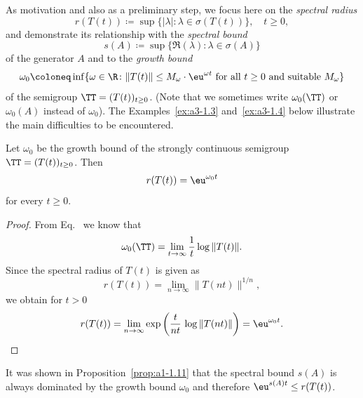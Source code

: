 As motivation and also as a preliminary step, we focus here on the \emph{spectral radius}
\begin{equation}\label{eq:a3-1.1}
	r(T(t)) \coloneq  \sup \{ |\lambda| \colon \lambda \in \sigma(T(t)) \}, \quad t \geq 0 ,
\end{equation}
and demonstrate its relationship with the \emph{spectral bound}
\begin{equation}\label{eq:a3-1.2}
	s(A) \coloneq  \sup \{ \Re(\lambda) \colon \lambda \in \sigma(A) \}
\end{equation}
of the generator $A$ and to the \emph{growth bound}
\begin{equation}\label{eq:a3-1.3}
	\omega_{0} \coloneq  \inf \{\omega \in \R  \colon \|T(t)\| \leq M_{\omega}\cdot \eu^{\omega t} \text{ for all } t \geq 0 \text{ and suitable } M_{\omega}\}
\end{equation}
of the semigroup $\TT = (T(t))_{t\geq 0}$.
(Note that we sometimes write $\omega_{0}(\TT)$ or $\omega_{0}(A)$ instead of\/ $\omega_{0}$).
%
The Examples~\ref{ex:a3-1.3} and~\ref{ex:a3-1.4} below illustrate the main difficulties to be encountered.
\begin{proposition}\label{prop:a3-1.1}
Let $\omega_{0}$ be the growth bound of the strongly continuous semigroup $\TT = (T(t))_{t\geq 0}$.
Then
\begin{equation}\label{eq:a3-1.4}
	r(T(t)) = \eu^{\omega_{0} t}
\end{equation}
for every $t \geq 0$.
\end{proposition}
\begin{proof}
From Eq.~ we know that
\[
    \omega_{0}(\TT) = \lim_{t \to \infty} \frac{1}{t} \log \|T(t)\| .
\]
Since the spectral radius of\/ $T(t)$ is given as
\[
    r(T(t)) = \lim_{n \to \infty} \|T(nt)\|^{1/n} ,
\]
we obtain for $t > 0$
\begin{equation*}
    r(T(t)) = \lim_{n \to \infty} \exp\left( \frac{t}{nt}\,\log \|T(nt)\|\right) = \eu^{\omega_{0} t} .
    \qedhere
\end{equation*}
\end{proof}
It was shown in Proposition~\ref{prop:a1-1.11} that the spectral bound $s(A)$ is always dominated by the growth bound $\omega_{0}$ and therefore $\eu^{s(A)t} \leq r(T(t))$.
